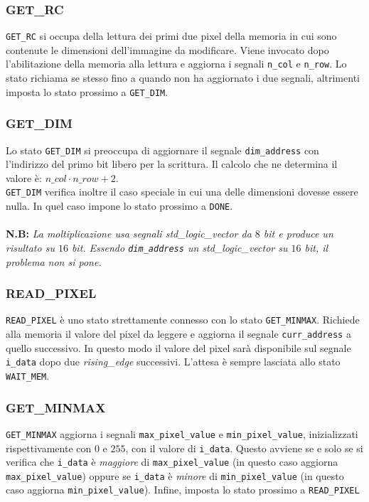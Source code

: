 \documentclass[11pt, a4paper]{article}
\begin{document}
\subsubsection{GET\_RC}
\texttt{GET\_RC} si occupa della lettura dei primi due pixel della memoria in cui sono contenute le dimensioni dell’immagine da modificare. Viene invocato dopo l'abilitazione della memoria alla lettura e aggiorna i segnali \texttt{n\_col} e \texttt{n\_row}. Lo stato richiama se stesso fino a quando non ha aggiornato i due segnali, altrimenti imposta lo stato prossimo a \texttt{GET\_DIM}.

\subsubsection{GET\_DIM}
Lo stato \texttt{GET\_DIM} si preoccupa di aggiornare il segnale \texttt{dim\_address} con l'indirizzo del primo bit libero per la scrittura. Il calcolo che ne determina il valore è: $n\_col \cdot n\_row + 2$.\\
\texttt{GET\_DIM} verifica inoltre il caso speciale in cui una delle dimensioni dovesse essere nulla. In quel caso impone lo stato prossimo a \texttt{DONE}.\\ \\
\textbf{N.B:}\textit{
La moltiplicazione usa segnali \textit{std\_logic\_vector} da $8$ bit e produce un risultato su $16$ bit. Essendo \texttt{dim\_address} un \textit{std\_logic\_vector} su $16$ bit, il problema non si pone.
}

\subsubsection{READ\_PIXEL}
\texttt{READ\_PIXEL} è uno stato strettamente connesso con lo stato \texttt{GET\_MINMAX}. Richiede alla memoria il valore del pixel da leggere e aggiorna il segnale \texttt{curr\_address} a quello successivo. In questo modo il valore del pixel sarà disponibile sul segnale \texttt{i\_data} dopo due \textit{rising\_edge} successivi. L'attesa è sempre lasciata allo stato \texttt{WAIT\_MEM}.

\subsubsection{GET\_MINMAX}
\texttt{GET\_MINMAX} aggiorna i segnali \texttt{max\_pixel\_value} e \texttt{min\_pixel\_value}, inizializzati rispettivamente con $0$ e $255$, con il valore di \texttt{i\_data}. Questo avviene se e solo se si verifica che \texttt{i\_data} è \textit{maggiore} di \texttt{max\_pixel\_value} (in questo caso aggiorna \texttt{max\_pixel\_value}) oppure se \texttt{i\_data} è \textit{minore} di \texttt{min\_pixel\_value} (in questo caso aggiorna \texttt{min\_pixel\_value}). Infine, imposta lo stato prossimo a \texttt{READ\_PIXEL}
\end{document}
